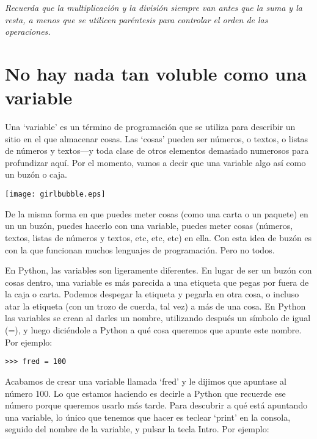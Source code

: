 \emph{Recuerda que la multiplicación y la división siempre van antes que la suma y la resta, a menos que se utilicen paréntesis para controlar el orden de las operaciones.}

\section{No hay nada tan voluble como una variable}

Una `variable' es un término de programación que se utiliza para describir un sitio en el que almacenar cosas. Las `cosas' pueden ser números, o textos, o listas de números y textos---y toda clase de otros elementos demasiado numerosos para profundizar aquí. Por el momento, vamos a decir que una variable algo así como un buzón o caja.

\begin{center}
\texttt{[image: girlbubble.eps]}
\end{center}

De la misma forma en que puedes meter cosas (como una carta o un paquete) en un un buzón, puedes hacerlo con una variable, puedes meter cosas (números, textos, listas de números y textos, etc, etc, etc) en ella. Con esta idea de buzón es con la que funcionan muchos lenguajes de programación. Pero no todos.

En Python, las variables son ligeramente diferentes. En lugar de ser un buzón con cosas dentro, una variable es más parecida a una etiqueta que pegas por fuera de la caja o carta. Podemos despegar la etiqueta y pegarla en otra cosa, o incluso atar la etiqueta (con un trozo de cuerda, tal vez) a más de una cosa. En Python las variables se crean al darles un nombre, utilizando después un símbolo de igual (=), y luego diciéndole a Python a qué cosa queremos que apunte este nombre. Por ejemplo:

\begin{listing}
\begin{verbatim}
>>> fred = 100
\end{verbatim}
\end{listing}

Acabamos de crear una variable llamada `fred' y le dijimos que apuntase al número 100. Lo que estamos haciendo es decirle a Python que recuerde ese número porque queremos usarlo más tarde. Para descubrir a qué está apuntando una variable, lo único que tenemos que hacer es teclear `print' en la consola, seguido del nombre de la variable, y pulsar la tecla Intro. Por ejemplo:

